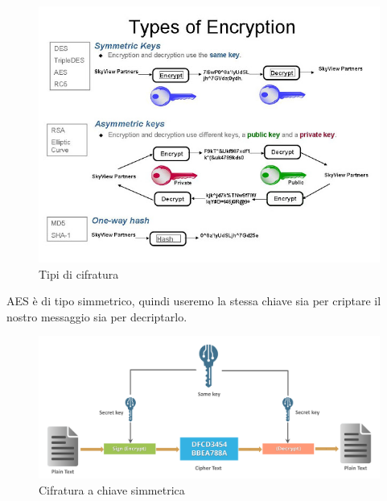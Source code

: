 \begin{figure}[H]
	\centering
	\includegraphics[width=1\textwidth, height=1\textheight, keepaspectratio]{./images/types_of_encryptions/types_of_encryption.png}
	\caption{Tipi di cifratura}
	\label{fig:encryption_types}
\end{figure}

\textsf{\small AES è di tipo simmetrico, quindi useremo la stessa chiave sia per criptare il nostro messaggio sia per decriptarlo. }

\begin{figure}[H]
	\centering
	\includegraphics[width=1\textwidth, height=1\textheight, keepaspectratio]{./images/types_of_encryptions/symmetric_vs_asymmetric/symmetric-key-what-is-cryptography.png}
	\caption{Cifratura a chiave simmetrica}
	\label{fig:symmetric_encryption}
\end{figure}

